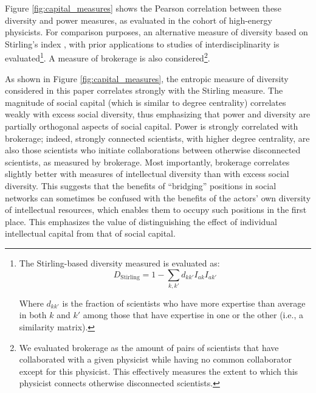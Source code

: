 \documentclass{article}
\begin{document}
Figure \ref{fig:capital_measures} shows the Pearson correlation between these diversity and power measures, as evaluated in the cohort of high-energy physicists. For comparison purposes, an alternative measure of diversity based on Stirling's index \citep{Stirling2007}, with prior applications to studies of interdisciplinarity \citep{Porter2007,Leahey2016} is evaluated\footnote{The Stirling-based diversity measured is evaluated as: \begin{equation}
    D_{\text{Stirling}} = 1-\sum_{k,k'}d_{kk'}I_{ak}I_{ak'}
\end{equation}

Where $d_{kk'}$ is the fraction of scientists who have more expertise than average in both $k$ and $k'$ among those that have expertise in one or the other (i.e., a similarity matrix).}. A measure of brokerage is also considered\footnote{We evaluated brokerage as the amount of pairs of scientists that have collaborated with a given physicist while having no common collaborator except for this physicist. This effectively measures the extent to which this physicist connects otherwise disconnected scientists.}. 

As shown in Figure \ref{fig:capital_measures}, the entropic measure of diversity considered in this paper correlates strongly with the Stirling measure. The magnitude of social capital (which is similar to degree centrality) correlates weakly with excess social diversity, thus emphasizing that power and diversity are partially orthogonal aspects of social capital. Power is strongly correlated with brokerage; indeed, strongly connected scientists, with higher degree centrality, are also those scientists who initiate collaborations between otherwise disconnected scientists, as measured by brokerage. Most importantly, brokerage correlates slightly better with measures of intellectual diversity than with excess social diversity. This suggests that the benefits of ``bridging'' positions in social networks can sometimes be confused with the benefits of the actors' own diversity of intellectual resources, which enables them to occupy such positions in the first place. This emphasizes the value of distinguishing the effect of individual intellectual capital from that of social capital.

\end{document}

